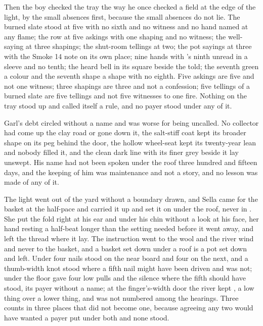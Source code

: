 Then the boy checked the tray the way he once checked a field at the edge of the light, by the small absences first, because the small absences do not lie. The burned slate stood at five with no sixth and no witness and no hand named at any flame; the row at five askings with one shaping and no witness; the well-saying at three shapings; the shut-room tellings at two; the pot sayings at three with the Smoke 14 note on its own place; nine hands with 's ninth unread in a sleeve and no tenth; the heard bell in its square beside the told; the seventh green a colour and the seventh shape a shape with no eighth. Five askings are five and not one witness; three shapings are three and not a confession; five tellings of a burned slate are five tellings and not five witnesses to one fire. Nothing on the tray stood up and called itself a rule, and no payer stood under any of it.

Garl's debt circled without a name and was worse for being uncalled. No collector had come up the clay road or gone down it, the salt-stiff coat kept its broader shape on its peg behind the door, the hollow wheel-seat kept its twenty-year lean and nobody filled it, and the clean dark line with its finer grey beside it lay unswept. His name had not been spoken under the roof three hundred and fifteen days, and the keeping of him was maintenance and not a story, and no lesson was made of any of it.

\scenebreak

The light went out of the yard without a boundary drawn, and Sella came for the basket at the half-pace and carried it up and set it on  under the roof, never in . She put the fold right at his ear and under his chin without a look at his face, her hand resting a half-beat longer than the setting needed before it went away, and left the thread where it lay. The instruction went to the wool and the river wind and never to the basket, and a basket set down under a roof is a pot set down and left. Under  four nails stood on the near board and four on the next, and a thumb-width knot stood where a fifth nail might have been driven and was not; under the floor  gave four low pulls and the silence where the fifth should have stood, its payer without a name; at the finger's-width door the river kept , a low thing over a lower thing, and was not numbered among the hearings. Three counts in three places that did not become one, because agreeing any two would have wanted a payer put under both and none stood.

